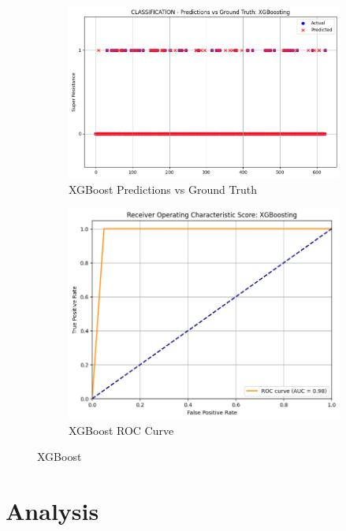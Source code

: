 \documentclass[manuscript,screen,review, nonacm]{acmart}
\begin{document}
\begin{figure}[H]
    \centering
    \begin{subfigure}{0.45\textwidth}
        \includegraphics[width=\linewidth]{figs/xgb1.png}
        \caption{XGBoost Predictions vs Ground Truth}
    \end{subfigure}
    \hfill
    \begin{subfigure}{0.45\textwidth}
        \includegraphics[width=\linewidth]{figs/xgb2.png}
        \caption{XGBoost ROC Curve}
    \end{subfigure}
    \caption{XGBoost}
\end{figure}


\section{Analysis}
\end{document}
